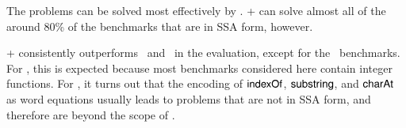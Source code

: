 %
%

The {\kaluzabench} problems can be solved most effectively by {\cvc}. \ostrich+ can solve almost all of the around 80\% of the benchmarks
that are in SSA form, however.
%

\ostrich+ consistently outperforms \ostrichi\ and \ostrichii\ in the
evaluation, except for the \kaluzabench\ benchmarks. For
\ostrichi, this is expected because most benchmarks considered
here contain integer functions. For \ostrichii, it turns out that the
encoding of $\mathsf{indexOf}$, $\mathsf{substring}$, and $\mathsf{charAt}$ as word equations
usually leads to problems that are not in SSA form, and therefore are
beyond the scope of \ostrich.


